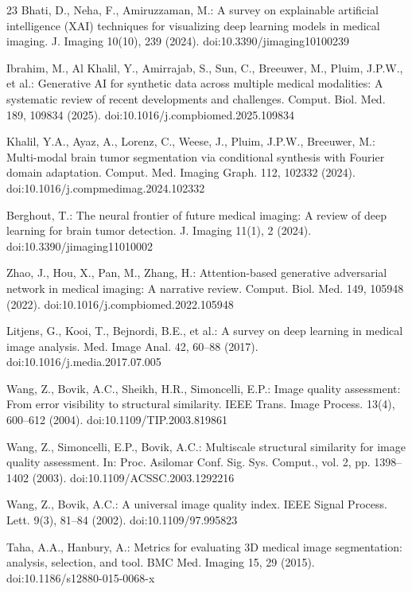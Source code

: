 \documentclass[runningheads]{llncs}
\begin{document}
\begin{thebibliography}{23}
Bhati, D., Neha, F., Amiruzzaman, M.: A survey on explainable artificial intelligence (XAI) techniques for visualizing deep learning models in medical imaging. J. Imaging 10(10), 239 (2024). doi:10.3390/jimaging10100239

Ibrahim, M., Al Khalil, Y., Amirrajab, S., Sun, C., Breeuwer, M., Pluim, J.P.W., et al.: Generative AI for synthetic data across multiple medical modalities: A systematic review of recent developments and challenges. Comput. Biol. Med. 189, 109834 (2025). doi:10.1016/j.compbiomed.2025.109834

Khalil, Y.A., Ayaz, A., Lorenz, C., Weese, J., Pluim, J.P.W., Breeuwer, M.: Multi-modal brain tumor segmentation via conditional synthesis with Fourier domain adaptation. Comput. Med. Imaging Graph. 112, 102332 (2024). doi:10.1016/j.compmedimag.2024.102332

Berghout, T.: The neural frontier of future medical imaging: A review of deep learning for brain tumor detection. J. Imaging 11(1), 2 (2024). doi:10.3390/jimaging11010002

Zhao, J., Hou, X., Pan, M., Zhang, H.: Attention-based generative adversarial network in medical imaging: A narrative review. Comput. Biol. Med. 149, 105948 (2022). doi:10.1016/j.compbiomed.2022.105948

Litjens, G., Kooi, T., Bejnordi, B.E., et al.: A survey on deep learning in medical image analysis. Med. Image Anal. 42, 60--88 (2017). doi:10.1016/j.media.2017.07.005

Wang, Z., Bovik, A.C., Sheikh, H.R., Simoncelli, E.P.: Image quality assessment: From error visibility to structural similarity. IEEE Trans. Image Process. 13(4), 600--612 (2004). doi:10.1109/TIP.2003.819861

Wang, Z., Simoncelli, E.P., Bovik, A.C.: Multiscale structural similarity for image quality assessment. In: Proc. Asilomar Conf. Sig. Sys. Comput., vol. 2, pp. 1398--1402 (2003). doi:10.1109/ACSSC.2003.1292216

Wang, Z., Bovik, A.C.: A universal image quality index. IEEE Signal Process. Lett. 9(3), 81--84 (2002). doi:10.1109/97.995823

Taha, A.A., Hanbury, A.: Metrics for evaluating 3D medical image segmentation: analysis, selection, and tool. BMC Med. Imaging 15, 29 (2015). doi:10.1186/s12880-015-0068-x


\end{thebibliography}
\end{document}
